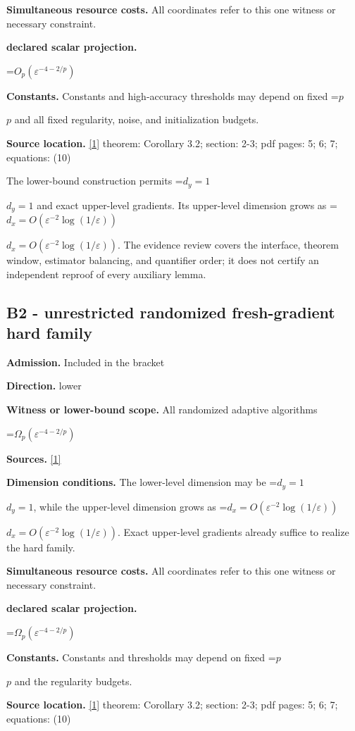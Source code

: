 \documentclass[10pt,a4paper]{article}
\newcommand{\AtlasMath}[1]{\par\begingroup\centering\setbox0=\hbox{$\displaystyle #1$}\ifdim\wd0>1.4\linewidth\typeout{ATLAS WIDE FORMULA: \the\wd0}\fi\ifdim\wd0>\linewidth\resizebox{\linewidth}{!}{\box0}\else\box0\fi\par\endgroup}
\newcommand{\AtlasInlineMath}[1]{\begingroup\setbox0=\hbox{$#1$}\ifdim\wd0>.4\linewidth\endgroup\AtlasMath{#1}\else\endgroup$#1$\fi}
\begin{document}
\textbf{Simultaneous resource costs.} All coordinates refer to this one witness or necessary constraint.

\textbf{declared scalar projection.}

\AtlasMath{O_p(\varepsilon ^{-4-2/p})}
\textbf{Constants.} Constants and high-accuracy thresholds may depend on fixed \AtlasInlineMath{p} and all fixed regularity, noise, and initialization budgets.

\textbf{Source location.} \href{https://arxiv.org/pdf/2610.03638v2}{[1]} theorem: Corollary 3.2; section: 2-3; pdf pages: 5; 6; 7; equations: (10)

The lower-bound construction permits \AtlasInlineMath{d_y=1} and exact upper-level gradients. Its upper-level dimension grows as \AtlasInlineMath{d_x=O(\varepsilon^{-2}\log(1/\varepsilon))}. The evidence review covers the interface, theorem window, estimator balancing, and quantifier order; it does not certify an independent reproof of every auxiliary lemma.

\subsection{B2 - unrestricted randomized fresh-gradient hard family}
\textbf{Admission.} Included in the bracket

\textbf{Direction.} lower

\textbf{Witness or lower-bound scope.} All randomized adaptive algorithms

\AtlasMath{\Omega_p(\varepsilon^{-4-2/p})}
\textbf{Sources.} \href{https://arxiv.org/pdf/2610.03638v2}{[1]}

\textbf{Dimension conditions.} The lower-level dimension may be \AtlasInlineMath{d_y=1}, while the upper-level dimension grows as \AtlasInlineMath{d_x=O(\varepsilon^{-2}\log(1/\varepsilon))}. Exact upper-level gradients already suffice to realize the hard family.

\textbf{Simultaneous resource costs.} All coordinates refer to this one witness or necessary constraint.

\textbf{declared scalar projection.}

\AtlasMath{\Omega _p(\varepsilon ^{-4-2/p})}
\textbf{Constants.} Constants and thresholds may depend on fixed \AtlasInlineMath{p} and the regularity budgets.

\textbf{Source location.} \href{https://arxiv.org/pdf/2610.03638v2}{[1]} theorem: Corollary 3.2; section: 2-3; pdf pages: 5; 6; 7; equations: (10)
\end{document}
